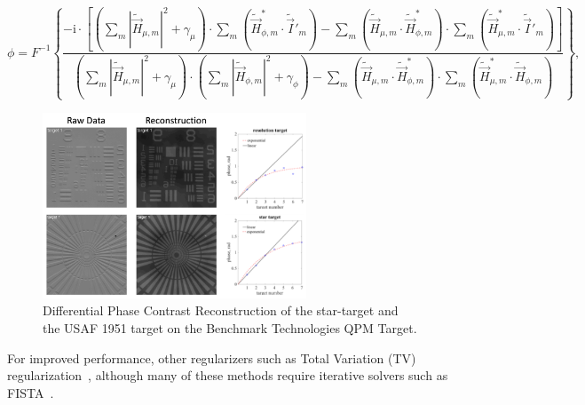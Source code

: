 \begin{equation} \label{eq:Hp_inverse}
\phi = F^{-1}\left\{\frac{-\mathrm{i}\cdot\left[\left(\sum\limits_{m}|\tilde{\vec{H}}_{\mu,m}|^2+\gamma_{\mu}\right)\cdot\sum\limits_{m}\left(\tilde{\vec{H}}^*_{\phi,m}\cdot\tilde{\vec{I}}'_{m}\right)-\sum\limits_{m}\left(\tilde{\vec{H}}_{\mu,m}\cdot\tilde{\vec{H}}^*_{\phi,m}\right)\cdot\sum\limits_{m}\left(\tilde{\vec{H}}^*_{\mu,m}\cdot\tilde{\vec{I}}'_{m}\right)\right]}{\left(\sum\limits_{m}|\tilde{\vec{H}}_{\mu,m}|^2+\gamma_{\mu}\right)\cdot\left(\sum\limits_{m}|\tilde{\vec{H}}_{\phi,m}|^2+\gamma_{\phi}\right)-\sum\limits_{m}\left(\tilde{\vec{H}}_{\mu,m}\cdot\tilde{\vec{H}}^*_{\phi,m}\right)\cdot\sum\limits_{m} \left( \tilde{\vec{H}}^*_{\mu,m}\cdot\tilde{\vec{H}}_{\phi,m} \right )} \right\},
\end{equation}


\begin{figure}[tbh]
\centering
\includegraphics[width=0.7\textwidth]{figures/fig_phase_dpc_validation_2.png}
\caption{\label{fig:dpc_validation}
Differential Phase Contrast Reconstruction of the star-target and the USAF 1951 target on the Benchmark Technologies QPM Target.}
\end{figure}

For improved performance, other regularizers such as Total Variation (TV) regularization~\cite{osher2005iterative}, although many of these methods require iterative solvers such as FISTA~\cite{beck2009fast}.

